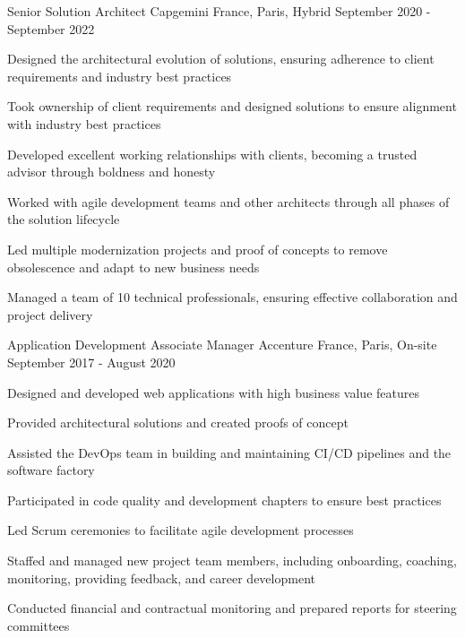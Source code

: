 \begin{cventries}
  \cventry
    {Senior Solution Architect}
    {Capgemini}
    {France, Paris, Hybrid}
    {September 2020 - September 2022}
    {
      \begin{cvitems}
        \item {Designed the architectural evolution of solutions, ensuring adherence to client requirements and industry best practices}
        \item {Took ownership of client requirements and designed solutions to ensure alignment with industry best practices}
        \item {Developed excellent working relationships with clients, becoming a trusted advisor through boldness and honesty}
        \item {Worked with agile development teams and other architects through all phases of the solution lifecycle}
        \item {Led multiple modernization projects and proof of concepts to remove obsolescence and adapt to new business needs}
        \item {Managed a team of 10 technical professionals, ensuring effective collaboration and project delivery}
      \end{cvitems}
    }

  \cventry
    {Application Development Associate Manager}
    {Accenture}
    {France, Paris, On-site}
    {September 2017 - August 2020}
    {
      \begin{cvitems}
        \item {Designed and developed web applications with high business value features}
        \item {Provided architectural solutions and created proofs of concept}
        \item {Assisted the DevOps team in building and maintaining CI/CD pipelines and the software factory}
        \item {Participated in code quality and development chapters to ensure best practices}
        \item {Led Scrum ceremonies to facilitate agile development processes}
        \item {Staffed and managed new project team members, including onboarding, coaching, monitoring, providing feedback, and career development}
        \item {Conducted financial and contractual monitoring and prepared reports for steering committees}
      \end{cvitems}
    }


\end{cventries}
